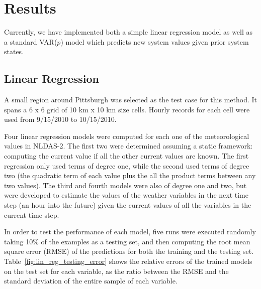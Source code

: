 \documentclass{article} %
\newcommand{\VARlag}{p}
\begin{document}
\section{Results}
\label{sec:results}
Currently, we have implemented both a simple linear regression model as well as a standard VAR($\VARlag$) model which predicts new system values given prior system states.

\subsection{Linear Regression}
A small region around Pittsburgh was selected as the test case for this method. It spans a 6 x 6 grid of 10 km x 10 km size cells. Hourly records for each cell were used from 9/15/2010 to 10/15/2010.

Four linear regression models were computed for each one of the meteorological values in NLDAS-2. The first two were determined assuming a static framework: computing the current value if all the other current values are known. The first regression only used terms of degree one, while the second used terms of degree two (the quadratic term of each value plus the all the product terms between any two values). The third and fourth models were also of degree one and two, but were developed to estimate the values of the weather variables in the next time step (an hour into the future) given the current values of all the variables in the current time step.

In order to test the performance of each model, five runs were executed randomly taking 10\% of the examples as a testing set, and then computing the root mean square error (RMSE) of the predictions for both the training and the testing set. Table~\ref{fig:lin_reg_testing_error} shows the relative errors of the trained models on the test set for each variable, as the ratio between the RMSE and the standard deviation of the entire sample of each variable.
\end{document}
